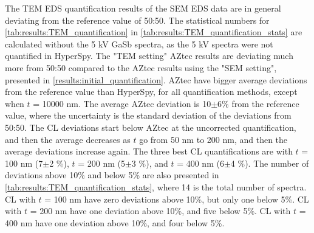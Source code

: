 The TEM EDS quantification results of the SEM EDS data are in general deviating from the reference value of 50:50.
The statistical numbers for \cref{tab:results:TEM_quantification} in \cref{tab:results:TEM_quantification_stats} are calculated without the 5 kV GaSb spectra, as the 5 kV spectra were not quantified in HyperSpy.
The "TEM setting" AZtec results are deviating much more from 50:50 compared to the AZtec results using the "SEM setting", presented in \cref{results:initial_quantification}.
AZtec have bigger average deviations from the reference value than HyperSpy, for all quantification methods, except when $t$ = 10000 nm. 
The average AZtec deviation is 10$\pm$6\% from the reference value, where the uncertainty is the standard deviation of the deviations from 50:50.
The CL deviations start below AZtec at the uncorrected quantification, and then the average decreases as $t$ go from 50 nm to 200 nm, and then the average deviations increase again.
The three best CL quantifications are with $t$ = 100 nm (7$\pm$2 \%), $t$ = 200 nm (5$\pm$3 \%), and $t$ = 400 nm (6$\pm$4 \%).
The number of deviations above 10\% and below 5\% are also presented in \cref{tab:results:TEM_quantification_stats}, where 14 is the total number of spectra.
CL with $t$ = 100 nm have zero deviations above 10\%, but only one below 5\%.
CL with $t$ = 200 nm have one deviation above 10\%, and five below 5\%.
CL with $t$ = 400 nm have one deviation above 10\%, and four below 5\%.
















